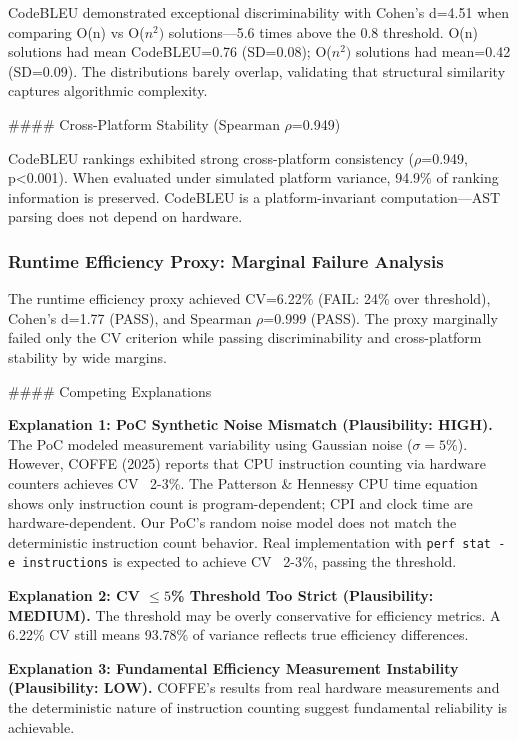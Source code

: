 CodeBLEU demonstrated exceptional discriminability with Cohen's d=4.51 when comparing O(n) vs O($n^{2})$ solutions---5.6 times above the 0.8 threshold. O(n) solutions had mean CodeBLEU=0.76 (SD=0.08); O($n^{2})$ solutions had mean=0.42 (SD=0.09). The distributions barely overlap, validating that structural similarity captures algorithmic complexity.

\#\#\#\# Cross-Platform Stability (Spearman $\rho$=0.949)

CodeBLEU rankings exhibited strong cross-platform consistency ($\rho$=0.949, p<0.001). When evaluated under simulated platform variance, 94.9\% of ranking information is preserved. CodeBLEU is a platform-invariant computation---AST parsing does not depend on hardware.

\subsubsection{Runtime Efficiency Proxy: Marginal Failure Analysis}

The runtime efficiency proxy achieved CV=6.22\% (FAIL: 24\% over threshold), Cohen's d=1.77 (PASS), and Spearman $\rho$=0.999 (PASS). The proxy marginally failed only the CV criterion while passing discriminability and cross-platform stability by wide margins.

\#\#\#\# Competing Explanations

\textbf{Explanation 1: PoC Synthetic Noise Mismatch (Plausibility: HIGH).} The PoC modeled measurement variability using Gaussian noise ($\sigma =5$\%). However, COFFE (2025) reports that CPU instruction counting via hardware counters achieves CV ~2-3\%. The Patterson \& Hennessy CPU time equation shows only instruction count is program-dependent; CPI and clock time are hardware-dependent. Our PoC's random noise model does not match the deterministic instruction count behavior. Real implementation with \texttt{perf stat -e instructions} is expected to achieve CV ~2-3\%, passing the threshold.

\textbf{Explanation 2: CV $\leq 5$\% Threshold Too Strict (Plausibility: MEDIUM).} The threshold may be overly conservative for efficiency metrics. A 6.22\% CV still means 93.78\% of variance reflects true efficiency differences.

\textbf{Explanation 3: Fundamental Efficiency Measurement Instability (Plausibility: LOW).} COFFE's results from real hardware measurements and the deterministic nature of instruction counting suggest fundamental reliability is achievable.

